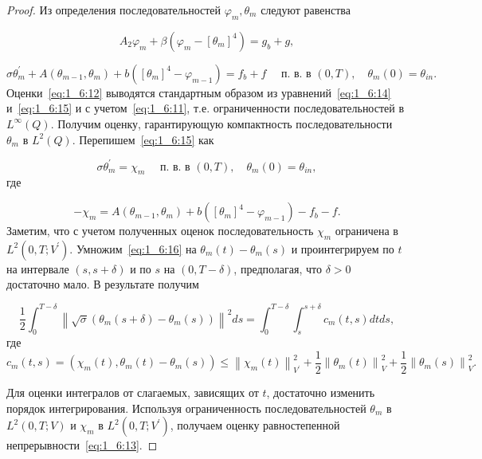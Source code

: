 \begin{proof}
    Из определения последовательностей $\varphi_{m}, \theta_{m}$ следуют равенства

    \begin{equation}
        \label{eq:1_6:14}
        A_{2} \varphi_{m}+\beta\left(\varphi_{m}-\left[\theta_{m}\right]^{4}\right)=g_{b}+g,
    \end{equation}

    \begin{equation}
        \label{eq:1_6:15}
        \sigma \theta_{m}^{\prime}+A\left(\theta_{m-1}, \theta_{m}\right)
        +b\left(\left[\theta_{m}\right]^{4}-\varphi_{m-1}\right)=f_{b}+f
        \quad \text { п. в. в }(0, T), \quad \theta_{m}(0)=\theta_{i n}.
    \end{equation}
    Оценки~\eqref{eq:1_6:12} выводятся стандартным образом
    из уравнений~\eqref{eq:1_6:14} и~\eqref{eq:1_6:15}
    и с учетом~\eqref{eq:1_6:11},
    т.е. ограниченности последовательностей в $L^{\infty}(Q)$.
    Получим оценку, гарантирующую компактность последовательности $\theta_{m}$ в $L^{2}(Q)$.
    Перепишем~\eqref{eq:1_6:15} как

    \begin{equation}
        \label{eq:1_6:16}
        \sigma \theta_{m}^{\prime}=\chi_{m} \quad \text { п. в. в }(0, T),
        \quad \theta_{m}(0)=\theta_{in},
    \end{equation}
    где

    \[
        -\chi_{m}=A\left(\theta_{m-1}, \theta_{m}\right)
        +b\left(\left[\theta_{m}\right]^{4}-\varphi_{m-1}\right)-f_{b}-f.
    \]
    Заметим, что с учетом полученных оценок последовательность $\chi_{m}$
    ограничена в $L^{2}\left(0, T ; V^{\prime}\right)$.
    Умножим~\eqref{eq:1_6:16} на $\theta_{m}(t)-\theta_{m}(s)$ и проинтегрируем по $t$
    на интервале $(s, s+\delta)$ и по $s$ на $(0, T-\delta)$,
    предполагая, что $\delta>0$ достаточно мало.
    В результате получим

    \[
        \frac{1}{2} \int_{0}^{T-\delta}\left\|\sqrt{\sigma}\left(\theta_{m}(s+\delta)
        -\theta_{m}(s)\right)\right\|^{2} d s
        =\int_{0}^{T-\delta} \int_{s}^{s+\delta} c_{m}(t, s) d t d s,
    \]
    где
    \[
        c_{m}(t, s)=\left(\chi_{m}(t), \theta_{m}(t)-\theta_{m}(s)\right)
        \leq\left\|\chi_{m}(t)\right\|_{V^{\prime}}^{2}
        +\frac{1}{2}\left\|\theta_{m}(t)\right\|_{V}^{2}
        +\frac{1}{2}\left\|\theta_{m}(s)\right\|_{V}^{2}.
    \]


    Для оценки интегралов от слагаемых, зависящих от $t$,
    достаточно изменить порядок интегрирования.
    Используя ограниченность последовательностей $\theta_{m}$ в $L^{2}(0, T ; V)$
    и $\chi_{m}$ в $L^{2}\left(0, T ; V^{\prime}\right)$,
    получаем оценку равностепенной непрерывности~\eqref{eq:1_6:13}.
\end{proof}

